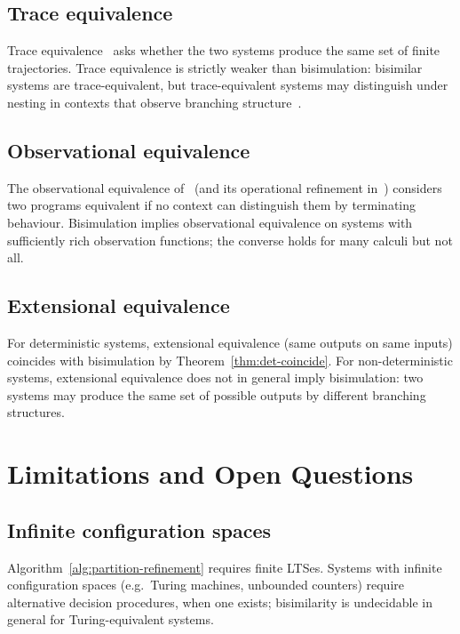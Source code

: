 \documentclass[twocolumn,11pt,a4paper]{article}
\begin{document}
\subsection{Trace equivalence}

Trace equivalence~\citep{hoare1985csp} asks whether the two systems produce the same set of finite trajectories. Trace equivalence is strictly weaker than bisimulation: bisimilar systems are trace-equivalent, but trace-equivalent systems may distinguish under nesting in contexts that observe branching structure~\citep{vanglabbeek2001linear}.

\subsection{Observational equivalence}

The observational equivalence of~\citet{morris1968lambda} (and its operational refinement in~\citealp{plotkin1977lcf}) considers two programs equivalent if no context can distinguish them by terminating behaviour. Bisimulation implies observational equivalence on systems with sufficiently rich observation functions; the converse holds for many calculi but not all.

\subsection{Extensional equivalence}

For deterministic systems, extensional equivalence (same outputs on same inputs) coincides with bisimulation by Theorem~\ref{thm:det-coincide}. For non-deterministic systems, extensional equivalence does not in general imply bisimulation: two systems may produce the same set of possible outputs by different branching structures.

\section{Limitations and Open Questions}
\label{sec:limitations}

\subsection{Infinite configuration spaces}

Algorithm~\ref{alg:partition-refinement} requires finite LTSes. Systems with infinite configuration spaces (e.g.\ Turing machines, unbounded counters) require alternative decision procedures, when one exists; bisimilarity is undecidable in general for Turing-equivalent systems.
\end{document}
